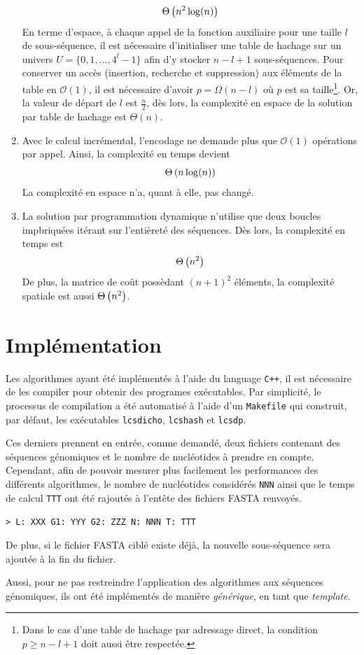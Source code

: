 \documentclass[a4paper, 12pt]{article}
\begin{document}
\begin{enumerate}[label=(\alph*)]
		\begin{equation}
			\Theta\left(n^2 \log(n)\right)
		\end{equation}
		En terme d'espace, à chaque appel de la fonction auxiliaire pour une taille $l$ de sous-séquence, il est nécessaire d'initialiser une table de hachage sur un univers $U = \{0,1,\ldots,4^l-1\}$ afin d'y stocker $n - l + 1$ sous-séquences. Pour conserver un accès (insertion, recherche et suppression) aux éléments de la table en $\mathcal{O}(1)$, il est nécessaire d'avoir $p = \Omega(n - l)$ où $p$ est sa taille\footnote{Dans le cas d'une table de hachage par adressage direct, la condition $p \geq n - l + 1$ doit aussi être respectée.}. Or, la valeur de départ de $l$ est $\frac{n}{2}$, dès lors, la complexité en espace de la solution par table de hachage est $\Theta(n)$.
		\item Avec le calcul incrémental, l'encodage ne demande plus que $\mathcal{O}(1)$ opérations par appel. Ainsi, la complexité en temps devient
		\begin{equation}
			\Theta\left(n \log(n)\right)
		\end{equation}
		La complexité en espace n'a, quant à elle, pas changé.
		\item La solution par programmation dynamique n'utilise que deux boucles impbriquées itérant sur l'entièreté des séquences. Dès lors, la complexité en temps est
		\begin{equation}
			\Theta\left(n^2\right)
		\end{equation}
		De plus, la matrice de coût possèdant $(n + 1)^2$ éléments, la complexité spatiale est aussi $\Theta\left(n^2\right)$.
	\end{enumerate}
	\section{Implémentation}
	Les algorithmes ayant été implémentés à l'aide du language \texttt{C++}, il est nécessaire de les compiler pour obtenir des programes exécutables. Par simplicité, le processus de compilation a été automatisé à l'aide d'un \texttt{Makefile} qui construit, par défaut, les exécutables \texttt{lcsdicho}, \texttt{lcshash} et \texttt{lcsdp}. \par
	Ces derniers prennent en entrée, comme demandé, deux fichiers contenant des séquences génomiques et le nombre de nucléotides à prendre en compte. Cependant, afin de pouvoir mesurer plus facilement les performances des différents algorithmes, le nombre de nucléotides considérés \texttt{NNN} ainsi que le temps de calcul \texttt{TTT} ont été rajoutés à l'entête des fichiers FASTA renvoyés.
	\begin{center}
		\texttt{> L: XXX G1: YYY G2: ZZZ N: NNN T: TTT}
	\end{center}
	De plus, si le fichier FASTA ciblé existe déjà, la nouvelle sous-séquence sera ajoutée à la fin du fichier. \par
	Aussi, pour ne pas restreindre l'application des algorithmes aux séquences génomiques, ils ont été implémentés de manière \emph{générique}, \cad{} en tant que \emph{template}.
\end{document}
